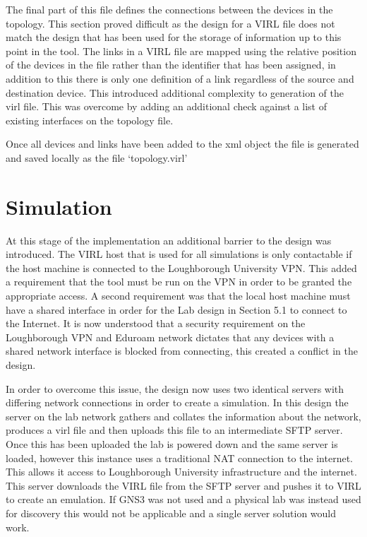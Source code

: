 \documentclass[11pt]{report}
\begin{document}
The final part of this file defines the connections between the devices in the topology. This section proved difficult as the design for a VIRL file does not match the design that has been used for the storage of information up to this point in the tool. The links in a VIRL file are mapped using the relative position of the devices in the file rather than the identifier that has been assigned, in addition to this there is only one definition of a link regardless of the source and destination device. This introduced additional complexity to generation of the virl file. This was overcome by adding an additional check against a list of existing interfaces on the topology file.

Once all devices and links have been added to the xml object the file is generated and saved locally as the file `topology.virl'

\section{Simulation}

At this stage of the implementation an additional barrier to the design was introduced. The VIRL host that is used for all simulations is only contactable if the host machine is connected to the Loughborough University VPN. This added a requirement that the tool must be run on the VPN in order to be granted the appropriate access. A second requirement was that the local host machine must have a shared interface in order for the Lab design in Section 5.1 to connect to the Internet. It is now understood that a security requirement on the Loughborough VPN and Eduroam network dictates that any devices with a shared network interface is blocked from connecting, this created a conflict in the design.

In order to overcome this issue, the design now uses two identical servers with differing network connections in order to create a simulation. In this design the server on the lab network gathers and collates the information about the network, produces a virl file and then uploads this file to an intermediate SFTP server. Once this has been uploaded the lab is powered down and the same server is loaded, however this instance uses a traditional NAT connection to the internet. This allows it access to Loughborough University infrastructure and the internet. This server downloads the VIRL file from the SFTP server and pushes it to VIRL to create an emulation. If GNS3 was not used and a physical lab was instead used for discovery this would not be applicable and a single server solution would work.
\end{document}

